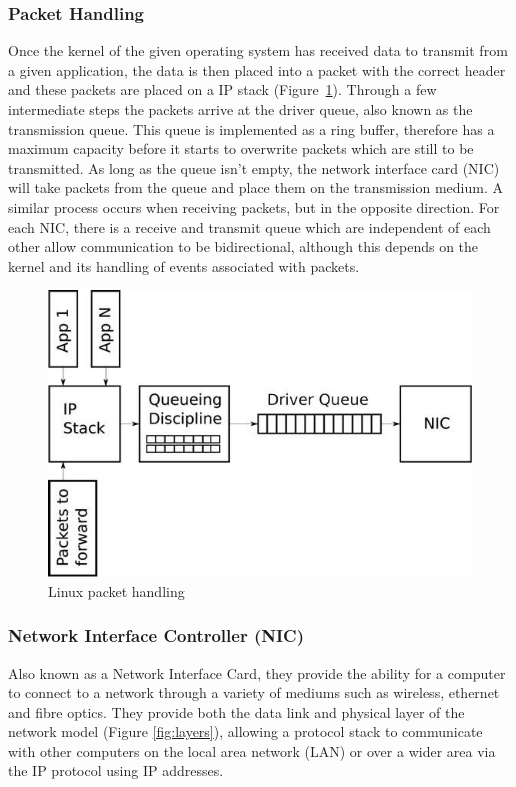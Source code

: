 \documentclass[final_report.tex]{subfiles}
\begin{document}
\subsubsection{Packet Handling}
\label{subsec:handling}
Once the kernel of the given operating system has received data to transmit from a given application, the data is then placed into a packet with the correct header and these packets are placed on a IP stack (Figure~\ref{fig:buffer}). Through a few intermediate steps the packets arrive at the driver queue, also known as the transmission queue. This queue is implemented as a ring buffer, therefore has a maximum capacity before it starts to overwrite packets which are still to be transmitted. As long as the queue isn't empty, the network interface card (NIC) will take packets from the queue and place them on the transmission medium. A similar process occurs when receiving packets, but in the opposite direction. For each NIC, there is a receive and transmit queue which are independent of each other allow communication to be bidirectional, although this depends on the kernel and its handling of events associated with packets.

\begin{figure}[H]
	\centering
	\includegraphics[width=\textwidth]{img/buffer.jpg}
	\caption{Linux packet handling \cite{buffer}}
	\label{fig:buffer}
\end{figure}

\subsubsection{Network Interface Controller (NIC)}
Also known as a Network Interface Card, they provide the ability for a computer to connect to a network through a variety of mediums such as wireless, ethernet and fibre optics. They provide both the data link and physical layer of the network model (Figure \ref{fig:layers}), allowing a protocol stack to communicate with other computers on the local area network (LAN) or over a wider area via the IP protocol using IP addresses.
\end{document}
